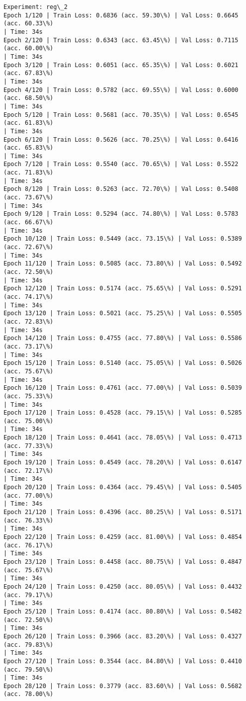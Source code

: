 \documentclass[8pt]{extarticle}
\begin{document}
\begin{Verbatim}[commandchars=\\\{\}]
Experiment: reg\_2
Epoch 1/120 | Train Loss: 0.6836 (acc. 59.30\%) | Val Loss: 0.6645 (acc. 60.33\%)
| Time: 34s
Epoch 2/120 | Train Loss: 0.6343 (acc. 63.45\%) | Val Loss: 0.7115 (acc. 60.00\%)
| Time: 34s
Epoch 3/120 | Train Loss: 0.6051 (acc. 65.35\%) | Val Loss: 0.6021 (acc. 67.83\%)
| Time: 34s
Epoch 4/120 | Train Loss: 0.5782 (acc. 69.55\%) | Val Loss: 0.6000 (acc. 68.50\%)
| Time: 34s
Epoch 5/120 | Train Loss: 0.5681 (acc. 70.35\%) | Val Loss: 0.6545 (acc. 61.83\%)
| Time: 34s
Epoch 6/120 | Train Loss: 0.5626 (acc. 70.25\%) | Val Loss: 0.6416 (acc. 65.83\%)
| Time: 34s
Epoch 7/120 | Train Loss: 0.5540 (acc. 70.65\%) | Val Loss: 0.5522 (acc. 71.83\%)
| Time: 34s
Epoch 8/120 | Train Loss: 0.5263 (acc. 72.70\%) | Val Loss: 0.5408 (acc. 73.67\%)
| Time: 34s
Epoch 9/120 | Train Loss: 0.5294 (acc. 74.80\%) | Val Loss: 0.5783 (acc. 66.67\%)
| Time: 34s
Epoch 10/120 | Train Loss: 0.5449 (acc. 73.15\%) | Val Loss: 0.5389 (acc. 72.67\%)
| Time: 34s
Epoch 11/120 | Train Loss: 0.5085 (acc. 73.80\%) | Val Loss: 0.5492 (acc. 72.50\%)
| Time: 34s
Epoch 12/120 | Train Loss: 0.5174 (acc. 75.65\%) | Val Loss: 0.5291 (acc. 74.17\%)
| Time: 34s
Epoch 13/120 | Train Loss: 0.5021 (acc. 75.25\%) | Val Loss: 0.5505 (acc. 72.83\%)
| Time: 34s
Epoch 14/120 | Train Loss: 0.4755 (acc. 77.80\%) | Val Loss: 0.5586 (acc. 73.17\%)
| Time: 34s
Epoch 15/120 | Train Loss: 0.5140 (acc. 75.05\%) | Val Loss: 0.5026 (acc. 75.67\%)
| Time: 34s
Epoch 16/120 | Train Loss: 0.4761 (acc. 77.00\%) | Val Loss: 0.5039 (acc. 75.33\%)
| Time: 34s
Epoch 17/120 | Train Loss: 0.4528 (acc. 79.15\%) | Val Loss: 0.5285 (acc. 75.00\%)
| Time: 34s
Epoch 18/120 | Train Loss: 0.4641 (acc. 78.05\%) | Val Loss: 0.4713 (acc. 77.33\%)
| Time: 34s
Epoch 19/120 | Train Loss: 0.4549 (acc. 78.20\%) | Val Loss: 0.6147 (acc. 72.17\%)
| Time: 34s
Epoch 20/120 | Train Loss: 0.4364 (acc. 79.45\%) | Val Loss: 0.5405 (acc. 77.00\%)
| Time: 34s
Epoch 21/120 | Train Loss: 0.4396 (acc. 80.25\%) | Val Loss: 0.5171 (acc. 76.33\%)
| Time: 34s
Epoch 22/120 | Train Loss: 0.4259 (acc. 81.00\%) | Val Loss: 0.4854 (acc. 76.17\%)
| Time: 34s
Epoch 23/120 | Train Loss: 0.4458 (acc. 80.75\%) | Val Loss: 0.4847 (acc. 75.67\%)
| Time: 34s
Epoch 24/120 | Train Loss: 0.4250 (acc. 80.05\%) | Val Loss: 0.4432 (acc. 79.17\%)
| Time: 34s
Epoch 25/120 | Train Loss: 0.4174 (acc. 80.80\%) | Val Loss: 0.5482 (acc. 72.50\%)
| Time: 34s
Epoch 26/120 | Train Loss: 0.3966 (acc. 83.20\%) | Val Loss: 0.4327 (acc. 79.83\%)
| Time: 34s
Epoch 27/120 | Train Loss: 0.3544 (acc. 84.80\%) | Val Loss: 0.4410 (acc. 79.50\%)
| Time: 34s
Epoch 28/120 | Train Loss: 0.3779 (acc. 83.60\%) | Val Loss: 0.5682 (acc. 78.00\%)

\end{Verbatim}
\end{document}
